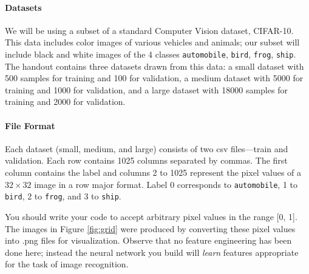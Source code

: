 \documentclass[11pt,addpoints,answers]{exam}
\begin{document}
\paragraph{Datasets} We will be using a subset of a standard Computer Vision dataset, CIFAR-10. This data includes color images of various vehicles and animals; our subset will include black and white images of the 4 classes \verb|automobile|, \verb|bird|, \verb|frog|, \verb|ship|. The handout contains three datasets drawn from this data: a small dataset with 500 samples for training and 100 for validation, a medium dataset with 5000 for training and 1000 for validation, and a large dataset with 18000 samples for training and 2000 for validation.


\paragraph{File Format} Each dataset (small, medium, and large) consists of two csv files---train and validation. Each row contains 1025 columns separated by commas. The first column contains the label and columns 2 to 1025 represent the pixel values of a $32 \times 32$ image in a row major format. Label 0 corresponds to \verb|automobile|, 1 to \verb|bird|, 2 to \verb|frog|, and 3 to \verb|ship|.
%

You should write your code to accept arbitrary pixel values in the range [0, 1]. The images in Figure \ref{fig:grid} were produced by converting these pixel values into .png files for visualization. Observe that no feature engineering has been done here; instead the neural network you build will \emph{learn} features appropriate for the task of image recognition.
\end{document}
